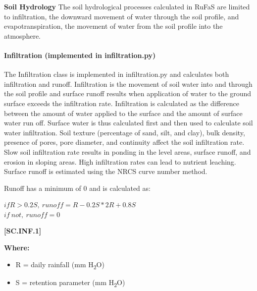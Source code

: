 \textbf{\large Soil Hydrology}
The soil hydrological processes calculated in RuFaS are limited to infiltration, the downward movement of water through the soil profile, and evapotranspiration, the movement of water from the soil profile into the atmosphere.
\vspace{0.25cm}
\paragraph{Infiltration (implemented in infiltration.py)}
\vspace{-0.25cm}

The Infiltration class is implemented in infiltration.py and calculates both infiltration and runoff. Infiltration is the movement of soil water into and through the soil profile and surface runoff results when application of water to the ground surface exceeds the infiltration rate. Infiltration is calculated as the difference between the amount of water applied to the surface and the amount of surface water run off. Surface water is thus calculated first and then used to calculate soil water infiltration. Soil texture (percentage of sand, silt, and clay), bulk density, presence of pores, pore diameter, and continuity affect the soil infiltration rate. Slow soil infiltration rate results in ponding in the level areas, surface runoff, and erosion in sloping areas. High infiltration rates can lead to nutrient leaching. Surface runoff is estimated using the NRCS curve number method.

Runoff has a minimum of 0 and is calculated as:
            \vspace{0.5cm}

    \begin{center}
\(if R > 0.2S,\ runoff=R-0.2S*2R+0.8S\) \\
\(if\ not,\ runoff=0	\)
    \end{center}
        \vspace{0.5cm} 
    
            {\raggedleft \textbf{[SC.INF.1]}\par}
            \vspace{0.5cm}

        \textbf{Where:}
            
        \begin{itemize}
            \item R	=	daily rainfall (mm H\textsubscript{2}O) 
            \item S	=	retention parameter (mm H\textsubscript{2}O)
        \end{itemize}


